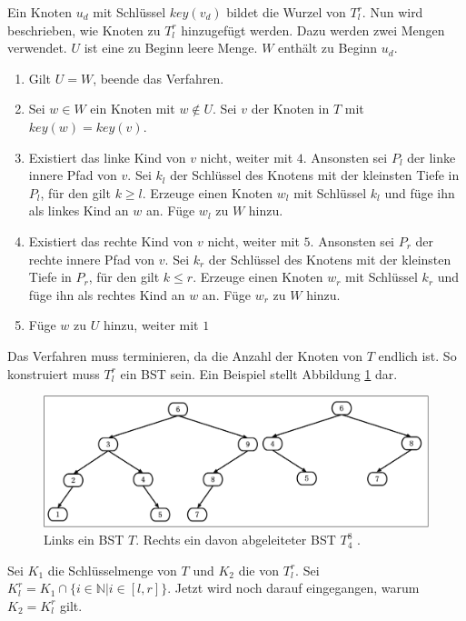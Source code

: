 \documentclass[a4paper,12pt]{article}
\begin{document}
\noindent Ein Knoten $u_d$ mit Schlüssel $\mathit{key}(v_d)$ bildet die Wurzel von $T^r_l$. Nun wird beschrieben, wie Knoten zu $T^r_l$ hinzugefügt werden.
Dazu werden zwei Mengen verwendet. $U$ ist eine zu Beginn leere Menge. $W$ enthält zu Beginn $u_d$.
\begin{enumerate}
	\item Gilt $U = W$, beende das Verfahren.
	\item Sei $w \in W$ ein Knoten mit $w \notin U$.  Sei $v$ der Knoten in $T$ mit \mbox{$\mathit{key}(w ) = \mathit{key}(v)$}.  
	\item Existiert das linke Kind von $v$ nicht, weiter mit $4$. Ansonsten sei  $P_l$ der linke innere Pfad von $v$. Sei $k_l$ der Schlüssel des Knotens mit der kleinsten Tiefe in $P_l$, für den gilt $k \geq l$. Erzeuge einen Knoten $w_l$ mit Schlüssel $k_l$ und füge ihn als linkes Kind an $w$ an. Füge $w_l$ zu $W$ hinzu.
	\item Existiert das rechte Kind von $v$ nicht, weiter mit $5$. Ansonsten sei $P_r$ der rechte innere Pfad von $v$. Sei $k_r$ der Schlüssel des Knotens mit der kleinsten Tiefe in $P_r$, für den gilt  $k \leq r$. Erzeuge einen Knoten $w_r$ mit Schlüssel $k_r$ und füge ihn als rechtes Kind an $w$ an. Füge $w_r$ zu $W$ hinzu.	
	\item Füge $w$ zu $U$ hinzu, weiter mit $1$
\end{enumerate}
Das Verfahren muss terminieren, da die Anzahl der Knoten von $T$ endlich ist. So konstruiert muss $T^r_l$ ein BST sein. Ein Beispiel stellt Abbildung \ref{fig:T_r_l} dar. 
\begin{figure}[H]
	\centering
	\includegraphics[width= 1\textwidth]{Medien/DynOpt/T_r_l}
	\caption{Links ein BST $T$. Rechts ein davon abgeleiteter BST $T^8_4$ .  }
	\label{fig:T_r_l}
\end{figure}

\noindent Sei $K_1$ die Schlüsselmenge von $T$ und $K_2$ die von $T^r_l$. Sei ${K^r_l = K_1 \cap \{i \in \mathbb{N}\vert i \in \left[l,r\right] \}}$. Jetzt wird noch darauf eingegangen, warum $K_2 = K^r_l$ gilt. \\
\end{document}
